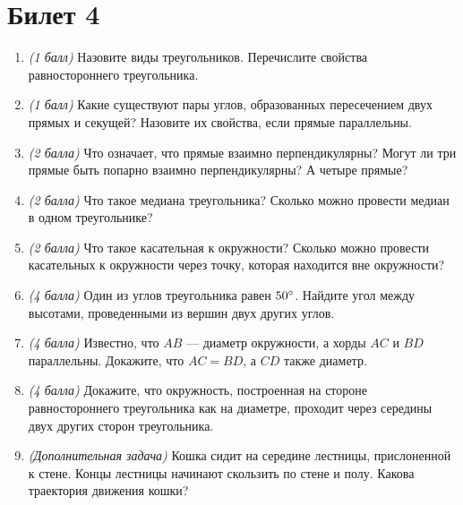 \documentclass[12pt, a4paper]{article}
\begin{document}
\section*{Билет 4}
\begin{enumerate}
\item \textit{(1 балл)} Назовите виды треугольников. Перечислите свойства равностороннего треугольника.
\item \textit{(1 балл)} Какие существуют пары углов, образованных пересечением двух прямых и секущей? Назовите их свойства, если прямые параллельны.
\item \textit{(2 балла)} Что означает, что прямые взаимно перпендикулярны? Могут ли три прямые быть попарно взаимно перпендикулярны? А четыре прямые?
\item \textit{(2 балла)} Что такое медиана треугольника? Сколько можно провести медиан в одном треугольнике?
\item \textit{(2 балла)} Что такое касательная к окружности? Сколько можно провести касательных к окружности через точку, которая находится вне окружности?
\item \textit{(4 балла)} Один из углов треугольника равен $50\degree$. Найдите угол между высотами, проведенными из вершин двух других углов.
\item \textit{(4 балла)} Известно, что $AB$ — диаметр окружности, а хорды $AC$ и $BD$ параллельны. Докажите, что $AC = BD$, а $CD$ также диаметр.
\item \textit{(4 балла)} Докажите, что окружность, построенная на стороне равностороннего треугольника как на диаметре, проходит через середины двух других сторон треугольника.
\item \textit{(Дополнительная задача)} Кошка сидит на середине лестницы, прислоненной к стене. Концы лестницы начинают скользить по стене и полу. Какова траектория движения кошки?
\end{enumerate}
\end{document}
